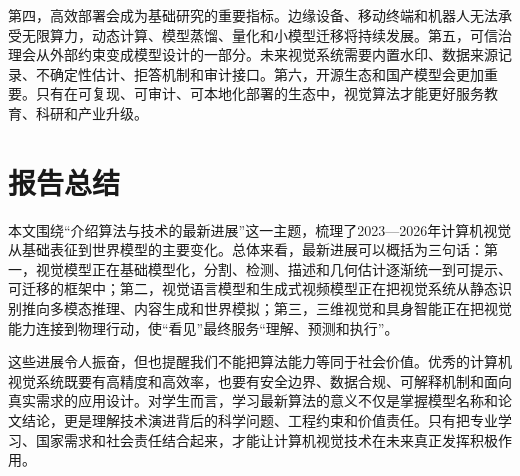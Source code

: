 \documentclass[UTF8,a4paper,12pt]{ctexart}
\begin{document}
第四，高效部署会成为基础研究的重要指标。边缘设备、移动终端和机器人无法承受无限算力，动态计算、模型蒸馏、量化和小模型迁移将持续发展。第五，可信治理会从外部约束变成模型设计的一部分。未来视觉系统需要内置水印、数据来源记录、不确定性估计、拒答机制和审计接口。第六，开源生态和国产模型会更加重要。只有在可复现、可审计、可本地化部署的生态中，视觉算法才能更好服务教育、科研和产业升级。

\section{报告总结}
本文围绕“介绍算法与技术的最新进展”这一主题，梳理了2023—2026年计算机视觉从基础表征到世界模型的主要变化。总体来看，最新进展可以概括为三句话：第一，视觉模型正在基础模型化，分割、检测、描述和几何估计逐渐统一到可提示、可迁移的框架中；第二，视觉语言模型和生成式视频模型正在把视觉系统从静态识别推向多模态推理、内容生成和世界模拟；第三，三维视觉和具身智能正在把视觉能力连接到物理行动，使“看见”最终服务“理解、预测和执行”。

这些进展令人振奋，但也提醒我们不能把算法能力等同于社会价值。优秀的计算机视觉系统既要有高精度和高效率，也要有安全边界、数据合规、可解释机制和面向真实需求的应用设计。对学生而言，学习最新算法的意义不仅是掌握模型名称和论文结论，更是理解技术演进背后的科学问题、工程约束和价值责任。只有把专业学习、国家需求和社会责任结合起来，才能让计算机视觉技术在未来真正发挥积极作用。
\end{document}
